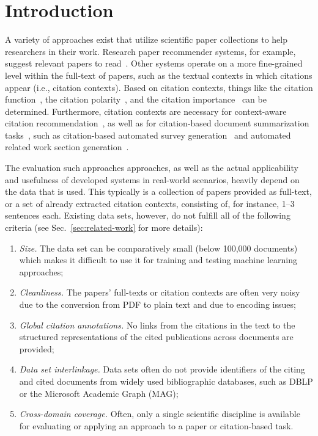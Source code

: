 \section{Introduction}
A variety of approaches exist that utilize scientific paper collections to help researchers in their work. 
Research paper recommender systems, for example, suggest relevant papers to read~\cite{Beel2016fixed}. Other systems operate on a more fine-grained level within the full-text of papers, such as the textual contexts in which citations appear (i.e., citation contexts). 
Based on citation contexts, things like the citation function~\cite{Teufel2006EMNLP,Teufel2006fixed,Moravcsik1975}, the citation polarity~\cite{GhoshD017,Abu-Jbara2013fixed}, and the citation importance~\cite{Valenzuela2015fixed,Chakraborty2016} can be determined. Furthermore, citation contexts are necessary for context-aware citation recommendation~\cite{He2010WWW,Ebensu2017}, as well as for citation-based document summarization tasks~\cite{Chandrasekaran2019}, such as citation-based automated survey generation~\cite{Mohammad2009} and automated related work section generation~\cite{Jinggiang2007}.

The evaluation such approaches approaches, as well as the actual applicability and usefulness of developed systems in real-world scenarios, heavily depend on the data that is used. This typically is a collection of papers provided as full-text, or a set of already extracted citation contexts, consisting of, for instance, 1--3 sentences each. Existing data sets, however, do not fulfill all of the following criteria (see Sec.~\ref{sec:related-work} for more details):
\begin{enumerate}
 \item \textit{Size.} The data set can be comparatively small (below 100,000 documents) which makes it difficult to use it for training and testing machine learning approaches; 
 \item \textit{Cleanliness.} The papers' full-texts or citation contexts are often very noisy due to the conversion from PDF to plain text and due to encoding issues;
 \item \textit{Global citation annotations.} No links from the citations in the text to the structured representations of the cited publications across documents are provided;
 \item \textit{Data set interlinkage.} Data sets often do not provide identifiers of the citing and cited documents from widely used bibliographic databases, such as DBLP or the Microsoft Academic Graph (MAG);
 \item \textit{Cross-domain coverage.} Often, only a single scientific discipline is available for evaluating or applying an approach to a paper or citation-based task.
\end{enumerate}


